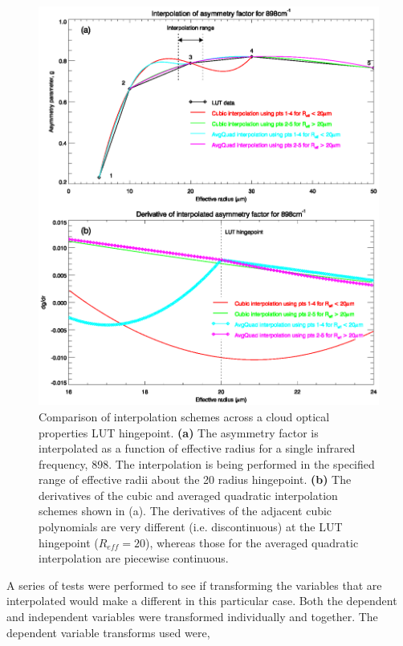 \begin{figure}[htp]
  \centering
  \includegraphics[scale=0.8]{graphics/Cloud/g_IR.Reff.898cm-1.eps}
  \caption{Comparison of interpolation schemes across a cloud optical properties LUT hingepoint. \textbf{(a)} The asymmetry factor is interpolated as a function of effective radius for a single infrared frequency, 898\invcm. The interpolation is being performed in the specified range of effective radii about the 20\micron{} radius hingepoint. \textbf{(b)} The derivatives of the cubic and averaged quadratic interpolation schemes shown in (a). The derivatives of the adjacent cubic polynomials are very different (i.e. discontinuous) at the LUT hingepoint ($R_{eff}=20$\micron), whereas those for the averaged quadratic interpolation are piecewise continuous.}
  \label{fig:g_IR.Reff.898cm-1}
\end{figure}

A series of tests were performed to see if transforming the variables that are interpolated would make a different in this particular case. Both the dependent and independent variables were transformed individually and together. The dependent variable transforms\cite{ref:variable_transform} used were,

